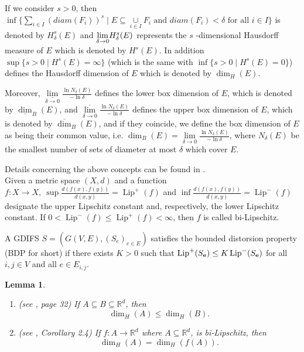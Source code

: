 \documentclass[a4paper,12pt,reqno]{amsart}
\numberwithin{equation}{section}
\newtheorem{lemma}[theorem]{Lemma}
\theoremstyle{definition}
\theoremstyle{remark}
\numberwithin{equation}{section}
\begin{document}
If we consider $s>0$, then $\inf \{\underset{i\in I}{\sum }%
(diam(F_{i}))^{s}\mid E\subseteq \underset{i\in I}{\cup }F_{i} \text{ and }  
diam(F_{i})<\delta  \text{ for all } i\in I\}$  is denoted by $H_{\delta }^{s}(E)$ and $\underset{%
\delta \rightarrow 0}{\lim }H_{\delta }^{s}(E)$ represents the $s$%
-dimensional Hausdorff measure of $E$ which is denoted by $H^{s}(E)$. In
addition $\sup \{s>0\mid H^{s}(E)=\infty \}$ (which is the same with $\inf
\{s>0\mid H^{s}(E)=0\}$) defines the Hausdorff dimension of $E$ which is
denoted by $\dim _{H}(E)$.

Moreover, $\underset{\delta \rightarrow 0}{\underline{\lim }}\frac{\ln
N_{\delta }(E)}{-\ln \delta }$ defines the lower box dimension of $E$, which
is denoted by $\underline{\dim }_{B}(E)$, and $\underset{\delta \rightarrow 0%
}{\overline{\lim }}\frac{\ln N_{\delta }(E)}{-\ln \delta }$ defines the
upper box dimension of $E$, which is denoted by $\overline{\dim }_{B}(E)$,
and if they coincide, we define the box dimension of $E$ as being their common
value, i.e. $\dim _{B}(E)=\underset{\delta \rightarrow 0}{\lim }\frac{\ln
N_{\delta }(E)}{-\ln \delta }$, where $N_{\delta}(E)$ be the smallest number of sets of diameter at most $\delta$  which cover $E.$ 

Details concerning the above concepts can be found in \cite{Fal}.\\
Given a metric space $(X,d)$ and a function $f:X \to X, ~ \sup \frac{d(f(x),f(y))}{d(x,y)}=\operatorname{Lip}^+(f)$ and $\inf \frac{d(f(x),f(y))}{d(x,y)}=\operatorname{Lip}^-(f)$ designate the upper Lipschitz constant and, respectively, the lower Lipschitz constant. If $0<\operatorname{Lip}^-(f)\le \operatorname{Lip}^+(f)<\infty$, then $f$ is called bi-Lipschitz.

A GDIFS $S=(G(V,E),(S_{e})_{e\in E})$ satisfies the bounded distorsion
property (BDP for short) if there exists $K>0$ such that $\operatorname{Lip}^{+}(S_{\mathbf{%
e}})\leq K\operatorname{Lip}^{-}(S_{\mathbf{e}})$ for all $i,j\in V$ and all $e\in E_{i,j}$.
\pagebreak

\begin{lemma} \label{FLemma} \hfill
\begin{enumerate}
    \item[a)](see \cite{Fal}, page 32) \textit{If} $A\subseteq B\subseteq \mathbb{R}^{d}$\textit{, then}%
\[
\dim _{H}(A)\leq \dim _{H}(B)\text{.}
\]

    \item[b)](see \cite{Fal}, Corollary 2.4)  If $f: A \to \mathbb{R}^d$ where $A \subseteq \mathbb{R}^d$, is bi-Lipschitz, then 
 	$$ \dim_{H}(A)=\dim_{H}(f(A)).$$
\end{enumerate}
\end{lemma}
\end{document}
